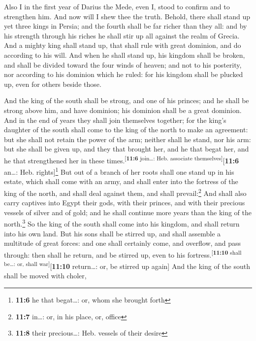  Also I in the first year of Darius the Mede, even I,
stood to confirm and to strengthen him.  And now will I
shew thee the truth. Behold, there shall stand up yet three kings in
Persia; and the fourth shall be far richer than they all: and by his
strength through his riches he shall stir up all against the realm of
Grecia.  And a mighty king shall stand up, that shall rule
with great dominion, and do according to his will.  And
when he shall stand up, his kingdom shall be broken, and shall be
divided toward the four winds of heaven; and not to his posterity, nor
according to his dominion which he ruled: for his kingdom shall be
plucked up, even for others beside those.

 And the king of the south shall be strong, and one of his
princes; and he shall be strong above him, and have dominion; his
dominion shall be a great dominion.  And in the end of
years they shall join themselves together; for the king's daughter of
the south shall come to the king of the north to make an agreement: but
she shall not retain the power of the arm; neither shall he stand, nor
his arm: but she shall be given up, and they that brought her, and he
that begat her, and he that strengthened her in these
times.\textsuperscript{{[}\textbf{11:6} join\ldots: Heb. associate
themselves{]}}{[}\textbf{11:6} an\ldots: Heb. rights{]}\footnote{\textbf{11:6}
  he that begat\ldots: or, whom she brought forth}  But
out of a branch of her roots shall one stand up in his estate, which
shall come with an army, and shall enter into the fortress of the king
of the north, and shall deal against them, and shall prevail:\footnote{\textbf{11:7}
  in\ldots: or, in his place, or, office}  And shall also
carry captives into Egypt their gods, with their princes, and with their
precious vessels of silver and of gold; and he shall continue more years
than the king of the north.\footnote{\textbf{11:8} their precious\ldots:
  Heb. vessels of their desire}  So the king of the south
shall come into his kingdom, and shall return into his own land.
 But his sons shall be stirred up, and shall assemble a
multitude of great forces: and one shall certainly come, and overflow,
and pass through: then shall he return, and be stirred up, even to his
fortress.\textsuperscript{{[}\textbf{11:10} shall be\ldots: or, shall
war{]}}{[}\textbf{11:10} return\ldots: or, be stirred up again{]}
 And the king of the south shall be moved with choler,
